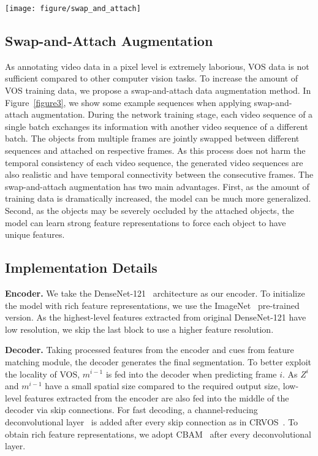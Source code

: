 \documentclass[runningheads]{llncs}
\begin{document}
\begin{figure*}[t]
	\centering
	\texttt{[image: figure/swap\_and\_attach]}
	\caption{Example video sequences before and after applying swap-and-attach data augmentation method.}
	\label{figure3}
\end{figure*}



\subsection{Swap-and-Attach Augmentation}
As annotating video data in a pixel level is extremely laborious, VOS data is not sufficient compared to other computer vision tasks. To increase the amount of VOS training data, we propose a swap-and-attach data augmentation method. In Figure~\ref{figure3}, we show some example sequences when applying swap-and-attach augmentation. During the network training stage, each video sequence of a single batch exchanges its information with another video sequence of a different batch. The objects from multiple frames are jointly swapped between different sequences and attached on respective frames. As this process does not harm the temporal consistency of each video sequence, the generated video sequences are also realistic and have temporal connectivity between the consecutive frames. The swap-and-attach augmentation has two main advantages. First, as the amount of training data is dramatically increased, the model can be much more generalized. Second, as the objects may be severely occluded by the attached objects, the model can learn strong feature representations to force each object to have unique features. 


\subsection{Implementation Details}
\noindent\textbf{Encoder.} We take the DenseNet-121~\cite{densenet} architecture as our encoder. To initialize the model with rich feature representations, we use the ImageNet~\cite{imagenet} pre-trained version. As the highest-level features extracted from original DenseNet-121 have low resolution, we skip the last block to use a higher feature resolution. 


\noindent\textbf{Decoder.} Taking processed features from the encoder and cues from feature matching module, the decoder generates the final segmentation. To better exploit the locality of VOS, $m^{i-1}$ is fed into the decoder when predicting frame $i$. As $Z^i$ and $m^{i-1}$ have a small spatial size compared to the required output size, low-level features extracted from the encoder are also fed into the middle of the decoder via skip connections. For fast decoding, a channel-reducing deconvolutional layer~\cite{deconv} is added after every skip connection as in CRVOS~\cite{CRVOS}. To obtain rich feature representations, we adopt CBAM~\cite{CBAM} after every deconvolutional layer. 
\end{document}
